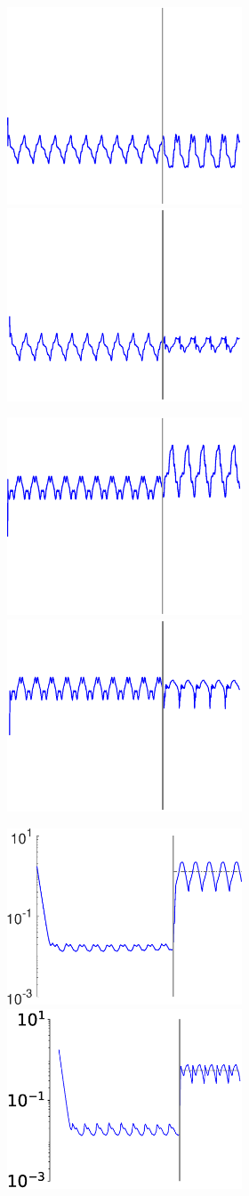 \begin{figure}
\begin{subfigure}{\textwidth}
\begin{subfigure}{\textwidth}
        \includegraphics[height=0.1\linewidth,width=.45\linewidth]{Figures/Fig_T3/MATLAB/RMHL_T2_Seg2_Theta0.eps}
        \includegraphics[trim=2cm 1cm 2cm 1cm, clip=true,height=0.1\linewidth,width=.45\linewidth]{Figures/Fig_T3/Python/RMHL_T2_Seg2_Theta0.eps}
        
        \end{subfigure}
         
        
        \textbf{}\begin{subfigure}{\textwidth}
        \centering
        
        \includegraphics[height=0.1\linewidth,width=.45\linewidth]{Figures/Fig_T3/MATLAB/RMHL_T2_Seg2_Theta1.eps}
        \includegraphics[trim=2cm 1cm 2cm 1cm, clip=true,height=0.1\linewidth,width=.45\linewidth]{Figures/Fig_T3/Python/RMHL_T2_Seg2_Theta1.eps}
        
        \end{subfigure}
         
        
        \textbf{}\begin{subfigure}{\textwidth}
        \centering
        
        \hspace{-2em}
        \includegraphics[height=0.15\linewidth,width=.45\linewidth]{Figures/Fig_T3/MATLAB/RMHL_T2_Seg2_MSE.eps}
        \hspace{.5em}
        \includegraphics[height=0.15\linewidth,width=.45\linewidth]{Figures/Fig_T3/Python/RMHL_T2_Seg2_MSE.eps}
        

\end{subfigure}
\end{subfigure}
\end{figure}
